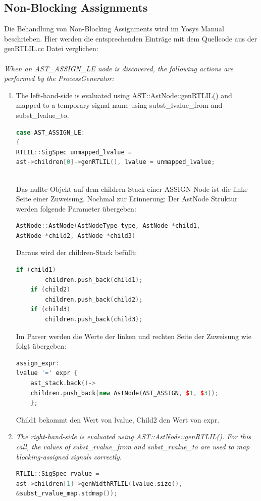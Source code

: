 \documentclass[11pt]{report}
\begin{document}

\subsection{Non-Blocking Assignments}

Die Behandlung von Non-Blocking Assignments wird im Yosys Manual beschrieben. Hier werden die entsprechenden Einträge mit dem Quellcode aus der genRTLIL.cc Datei verglichen:
\\
\\
\textit{
When an AST\_ASSIGN\_LE node is discovered, the following actions are performed by the ProcessGenerator:
}
\begin{enumerate}
  \item The left-hand-side is evaluated using AST::AstNode::genRTLIL() and mapped to a temporary signal name using subst\_lvalue\_from and subst\_lvalue\_to.
  \begin{lstlisting}[language=C++]
case AST_ASSIGN_LE:
{
RTLIL::SigSpec unmapped_lvalue = 
ast->children[0]->genRTLIL(), lvalue = unmapped_lvalue;
	
  \end{lstlisting}
Das nullte Objekt auf dem children Stack einer ASSIGN Node ist die linke Seite einer Zuweisung.
Nochmal zur Erinnerung: Der AstNode Struktur werden folgende Parameter übergeben:
\begin{lstlisting}[language=C++]
AstNode::AstNode(AstNodeType type, AstNode *child1, 
AstNode *child2, AstNode *child3)
\end{lstlisting}

Daraus wird der children-Stack befüllt:
\begin{lstlisting}[language=C++]
	if (child1)
		children.push_back(child1);
	if (child2)
		children.push_back(child2);
	if (child3)
		children.push_back(child3);
\end{lstlisting}
 
Im Parser werden die Werte der linken und rechten Seite der Zuweisung wie folgt übergeben:
\begin{lstlisting}[language=C++]
assign_expr:
lvalue '=' expr {
	ast_stack.back()->
	children.push_back(new AstNode(AST_ASSIGN, $1, $3));
	};	
\end{lstlisting}

Child1 bekommt den Wert von lvalue, Child2 den Wert von expr.

  \item \textit{The right-hand-side is evaluated using AST::AstNode::genRTLIL(). For this call, the values of subst\_rvalue\_from and subst\_rvalue\_to are used to map blocking-assigned signals correctly.}
\begin{lstlisting}[language=C++]
RTLIL::SigSpec rvalue = 
ast->children[1]->genWidthRTLIL(lvalue.size(), 
&subst_rvalue_map.stdmap());
\end{lstlisting}   
  

\end{enumerate}
\end{document}
